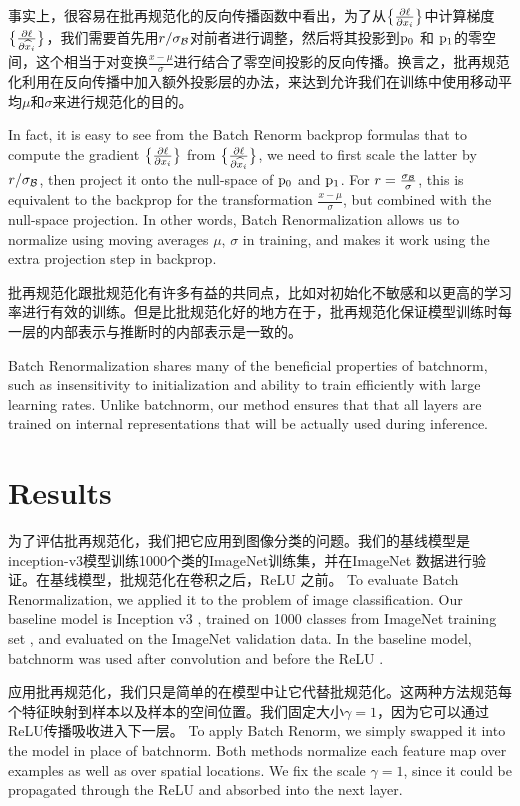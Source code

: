 事实上，很容易在批再规范化的反向传播函数中看出，为了从$\big\{\frac{\partial \ell}{\partial x_i}\big\}$中计算梯度$\big\{\frac{\partial \ell}{\partial \widehat{x}_i}\big\}$，我们需要首先用$r/\sigma_{\mathcal{B}}$对前者进行调整，然后将其投影到$\mathrm{p}_0$ 和 $\mathrm{p}_1$的零空间，这个相当于对变换$\frac{x-\mu}{\sigma}$进行结合了零空间投影的反向传播。换言之，批再规范化利用在反向传播中加入额外投影层的办法，来达到允许我们在训练中使用移动平均$\mu$和$\sigma$来进行规范化的目的。

In fact, it is easy to see from the Batch Renorm backprop formulas that to compute the gradient $\big\{\frac{\partial \ell}{\partial x_i}\big\}$ from  $\big\{\frac{\partial \ell}{\partial \widehat{x}_i}\big\}$, we need to first scale the latter by $r/\sigma_{\mathcal{B}}$, then project it onto the null-space of $\mathrm{p}_0$ and $\mathrm{p}_1$. For $r=\frac{\sigma_{\mathcal{B}}}{\sigma}$, this is equivalent to the backprop for the transformation $\frac{x-\mu}{\sigma}$, but combined with the null-space projection. In other words, Batch Renormalization allows us to normalize using moving averages $\mu$, $\sigma$ in training, and makes it work using the extra projection step in backprop.

批再规范化跟批规范化有许多有益的共同点，比如对初始化不敏感和以更高的学习率进行有效的训练。但是比批规范化好的地方在于，批再规范化保证模型训练时每一层的内部表示与推断时的内部表示是一致的。

Batch Renormalization shares many of the beneficial properties of batchnorm, such as insensitivity to initialization and ability to train efficiently with large learning rates. Unlike batchnorm, our method ensures that that all layers are trained on internal representations that will be actually used during inference.

\section{Results}
为了评估批再规范化，我们把它应用到图像分类的问题。我们的基线模型是inception-v3模型训练1000个类的ImageNet训练集，并在ImageNet 数据进行验证。在基线模型，批规范化在卷积之后，ReLU 之前。
To evaluate Batch Renormalization, we applied it to the problem of image classification. Our baseline model is Inception v3 \cite{inception-v3}, trained on 1000 classes from ImageNet training set \cite{imagenet}, and evaluated on the ImageNet validation data. In the baseline model, batchnorm was used after convolution and before the ReLU \cite{relu}.

应用批再规范化，我们只是简单的在模型中让它代替批规范化。这两种方法规范每个特征映射到样本以及样本的空间位置。我们固定大小$\gamma=1$，因为它可以通过ReLU传播吸收进入下一层。
To apply Batch Renorm, we simply swapped it into the model in place of batchnorm. Both methods normalize each feature map over examples as well as over spatial locations. We fix the scale $\gamma=1$, since it could be propagated through the ReLU and absorbed into the next layer.


